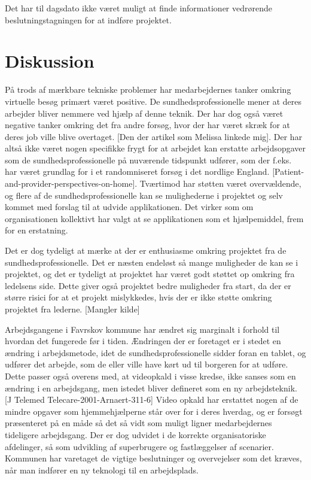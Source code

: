 Det har til dagsdato ikke været muligt at finde informationer vedrørende beslutningstagningen for at indføre projektet.

  
\section{Diskussion}
På trods af mærkbare tekniske problemer har medarbejdernes tanker omkring virtuelle besøg primært været positive. De sundhedsprofessionelle mener at deres arbejder bliver nemmere ved hjælp af denne teknik. Der har dog også været negative tanker omkring det fra andre forsøg, hvor der har været skræk for at deres job ville blive overtaget. [Den der artikel som Melissa linkede mig]. Der har altså ikke været nogen specifikke frygt for at arbejdet kan erstatte arbejdsopgaver som de sundhedsprofessionelle på nuværende tidspunkt udfører, som der f.eks. har været grundlag for i et randomniseret forsøg i det nordlige England. [Patient-and-provider-perspectives-on-home]. Tværtimod har støtten været overvældende, og flere af de sundhedsprofessionelle kan se mulighederne i projektet og selv kommet med forslag til at udvide applikationen. Det virker som om organisationen kollektivt har valgt at se applikationen som et hjælpemiddel, frem for en erstatning. 

Det er dog tydeligt at mærke at der er enthusiasme omkring projektet fra de sundhedsprofessionelle. Det er næsten endeløst så mange muligheder de kan se i projektet, og det er tydeligt at projektet har været godt støttet op omkring fra ledelsens side. Dette giver også projektet bedre muligheder fra start, da der er større risici for at et projekt mislykkedes, hvis der er ikke støtte omkring projektet fra lederne. [Mangler kilde] 

Arbejdsgangene i Favrskov kommune har ændret sig marginalt i forhold til hvordan det fungerede før i tiden. Ændringen der er foretaget er i stedet en ændring i arbejdsmetode, idet de sundhedsprofessionelle sidder foran en tablet, og udfører det arbejde, som de eller ville have kørt ud til borgeren for at udføre. Dette passer også overens med, at videopkald i visse kredse, ikke sanses som en ændring i en arbejdsgang, men istedet bliver defineret som en ny arbejdsteknik. [J Telemed Telecare-2001-Arnaert-311-6] Video opkald har erstattet nogen af de mindre opgaver som hjemmehjælperne står over for i deres hverdag, og er forsøgt præsenteret på en måde så det så vidt som muligt ligner medarbejdernes tideligere arbejdsgang. Der er dog udvidet i de korrekte organisatoriske afdelinger, så som udvikling af superbrugere og fastlæggelser af scenarier. Kommunen har varetaget de vigtige beslutninger og overvejelser som det kræves, når man indfører en ny teknologi til en arbejdsplads. 

